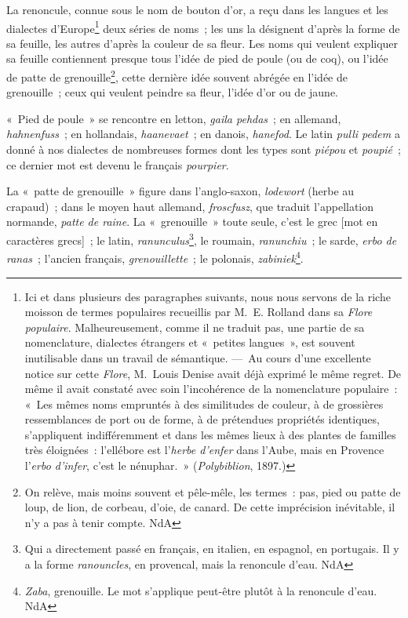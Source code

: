 \documentclass[french,twoside]{book} %
\def\mednobreak{\ifdim\lastskip<\medskipamount
  \removelastskip\nopagebreak\medskip\fi}
\newcommand{\labelblock}[1]{\medbreak{\noindent\color{rubric}\bfseries #1}\par\mednobreak}
\begin{document}
\labelblock{{\itshape Renoncule. Joubarbe. Fumeterre.}}

\noindent La renoncule, connue sous le nom de bouton d’or, a reçu dans les langues et les dialectes d’Europe\footnote{ Ici et dans plusieurs des paragraphes suivants, nous nous servons de la riche moisson de termes populaires recueillis par M. E. Rolland dans sa {\itshape Flore populaire}. Malheureusement, comme il ne traduit pas, une partie de sa nomenclature, dialectes étrangers et « petites langues », est souvent inutilisable dans un travail de sémantique. — Au cours d’une excellente notice sur cette {\itshape Flore}, M. Louis Denise avait déjà exprimé le même regret. De même il avait constaté avec soin l’incohérence de la nomenclature populaire : « Les mêmes noms empruntés à des similitudes de couleur, à de grossières ressemblances de port ou de forme, à de prétendues propriétés identiques, s’appliquent indifféremment et dans les mêmes lieux à des plantes de familles très éloignées : l’ellébore est l’{\itshape herbe d’enfer} dans l’Aube, mais en Provence l’{\itshape erbo d’infer}, c’est le nénuphar. » ({\itshape Polybiblion}, 1897.)} deux séries de noms ; les uns la désignent d’après la forme de sa feuille, les autres d’après la couleur de sa fleur. Les noms qui veulent expliquer sa feuille contiennent presque tous l’idée de pied de poule (ou de coq), ou l’idée de patte de grenouille\footnote{ On relève, mais moins souvent et pêle-mêle, les termes : pas, pied ou patte de loup, de lion, de corbeau, d’oie, de canard. De cette imprécision inévitable, il n’y a pas à tenir compte. NdA}, cette dernière idée souvent abrégée en l’idée de grenouille ; ceux qui veulent peindre sa fleur, l’idée d’or ou de jaune.\par
« Pied de poule » se rencontre en letton, {\itshape gaila pehdas} ; en allemand, {\itshape hahnenfuss} ; en hollandais, {\itshape haanevaet} ; en danois, {\itshape hanefod}. Le latin {\itshape pulli pedem} a donné à nos dialectes de nombreuses formes dont les types sont {\itshape piépou} et {\itshape poupié} ; ce dernier mot est devenu le français {\itshape pourpier}.\par
La « patte de grenouille » figure dans l’anglo-saxon, {\itshape lodewort} (herbe au crapaud) ; dans le moyen haut allemand, {\itshape froscfusz}, que traduit l’appellation normande, {\itshape patte de raine}. La « grenouille » toute seule, c’est le grec [mot en caractères grecs] ; le latin, {\itshape ranunculus}\footnote{ Qui a directement passé en français, en italien, en espagnol, en portugais. Il y a la forme {\itshape ranouncles}, en provencal, mais la renoncule d’eau. NdA}, le roumain, {\itshape ranunchiu} ; le sarde, {\itshape erbo de ranas} ; l’ancien français, {\itshape grenouillette} ; le polonais, {\itshape zabiniek}\footnote{ {\itshape Zaba}, grenouille. Le mot s’applique peut-être plutôt à la renoncule d’eau. NdA}.\par
\end{document}
